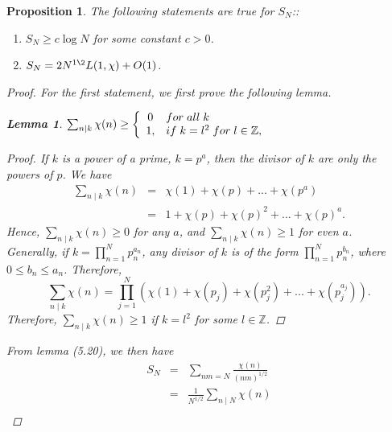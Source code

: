 \documentclass[psamsfonts]{amsart}
\newtheorem{prop}[thm]{Proposition}
\newtheorem{lem}[thm]{Lemma}
\theoremstyle{definition}
\theoremstyle{remark}
\numberwithin{equation}{section}
\begin{document}
			
			\begin{prop}
				The following statements are true for $S_N$::
				\begin{enumerate}
					\item $S_N \geq c\log N$ for some constant $c > 0$.
					\item $S_N = 2N^{1\2} L(1,\chi) + O(1)$.
				\end{enumerate}
				
				\begin{proof}
					For the first statement, we first prove the following lemma.
					\begin{lem}
						$\sum_{n \mid k} \chi(n) \geq \left\{\begin{array}{cl}
								0 & for \hspace{1mm} all \hspace{1mm} k\\
								1, & if \hspace{1mm} k=l^2 \hspace{1mm} for \hspace{1mm} l \in \mathbb{Z},
									\end{array}\right.$
					\end{lem}
					\begin{proof}
						If $k$ is a power of a prime, $k = p^a$, then the divisor of $k$ are only the powers of $p$. We have
						\begin{eqnarray}
						\sum_{n \mid k} \chi(n) &=& \chi(1) + \chi(p) +...+\chi(p^a) \nonumber \\
						&=& 1 + \chi(p) + \chi(p)^2 +...+ \chi(p)^a.
						\end{eqnarray}
						Hence, $\sum_{n \mid k} \chi(n) \geq 0$ for any $a$, and $\sum_{n \mid k} \chi(n) \geq 1$ for even $a$.\\
						Generally, if $k = \prod_{n=1}^{N} p_n^{a_n}$, any divisor of $k$ is  of the form $\prod_{n=1}^{N} p_n^{b_n}$, where $0 \leq b_n \leq a_n$. Therefore,
						\begin{equation}
							\sum_{n \mid k} \chi(n) = \prod_{j=1}^{N}(\chi(1) + \chi(p_j) + \chi(p_j^2) + ... + \chi(p_j^{a_j})).
						\end{equation}
						Therefore, $\sum_{n \mid k}\chi(n) \geq 1$ if $k = l^2$ for some $l \in \mathbb{Z}$.
					\end{proof}
					From lemma (5.20), we then have
					\begin{eqnarray}
						S_N &=& \sum_{nm = N} \frac{\chi(n)}{(nm) ^{1/2}} \nonumber \\
							&=& \frac{1}{N^{1/2}} \sum_{n \mid N} \chi(n) \nonumber \\

\end{eqnarray}
\end{proof}
\end{prop}
\end{document}
